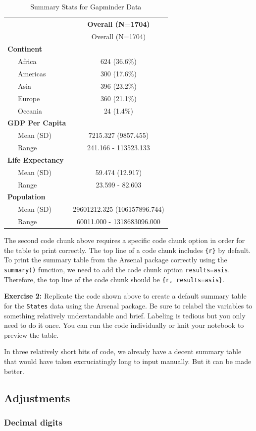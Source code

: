 \documentclass[
]{book}
\newenvironment{learncheck}%
{%
  \par\vspace{\baselineskip}\noindent 
  \color{Exercise}\begin{itshape}%
  \par\vspace{\baselineskip}\noindent\ignorespaces 
}%
{%
  \end{itshape}\ignorespacesafterend 
}
\begin{document}
\begin{longtable}[]{@{}lc@{}}
\caption{Summary Stats for Gapminder Data}\tabularnewline
\toprule
& Overall (N=1704)\tabularnewline
\midrule
\endfirsthead
\toprule
& Overall (N=1704)\tabularnewline
\midrule
\endhead
\textbf{Continent} &\tabularnewline
~~~Africa & 624 (36.6\%)\tabularnewline
~~~Americas & 300 (17.6\%)\tabularnewline
~~~Asia & 396 (23.2\%)\tabularnewline
~~~Europe & 360 (21.1\%)\tabularnewline
~~~Oceania & 24 (1.4\%)\tabularnewline
\textbf{GDP Per Capita} &\tabularnewline
~~~Mean (SD) & 7215.327 (9857.455)\tabularnewline
~~~Range & 241.166 - 113523.133\tabularnewline
\textbf{Life Expectancy} &\tabularnewline
~~~Mean (SD) & 59.474 (12.917)\tabularnewline
~~~Range & 23.599 - 82.603\tabularnewline
\textbf{Population} &\tabularnewline
~~~Mean (SD) & 29601212.325 (106157896.744)\tabularnewline
~~~Range & 60011.000 - 1318683096.000\tabularnewline
\bottomrule
\end{longtable}

The second code chunk above requires a specific code chunk option in order for the table to print correctly. The top line of a code chunk includes \texttt{\{r\}} by default. To print the summary table from the Arsenal package correctly using the \texttt{summary()} function, we need to add the code chunk option \texttt{results=\textquotesingle{}asis\textquotesingle{}}. Therefore, the top line of the code chunk should be \texttt{\{r,\ results=\textquotesingle{}asis\textquotesingle{}\}}.

\begin{learncheck}
\textbf{Exercise 2:} Replicate the code shown above to create a default
summary table for the \texttt{States} data using the Arsenal package. Be
sure to relabel the variables to something relatively understandable and
brief. Labeling is tedious but you only need to do it once. You can run
the code individually or knit your notebook to preview the table.
\end{learncheck}

In three relatively short bits of code, we already have a decent summary table that would have taken excruciatingly long to input manually. But it can be made better.

\hypertarget{adjustments}{%
\subsection{Adjustments}\label{adjustments}}

\hypertarget{decimal-digits}{%
\subsubsection*{Decimal digits}\label{decimal-digits}}
\end{document}
